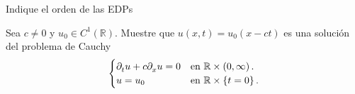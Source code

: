 \question

Indique el orden de las EDPs
\begin{multicols}{2}
\end{multicols}

\question

Sea $c\neq0$ y $u_{0}\in C^{1}\left(\mathbb{R}\right)$.
Muestre que $u\left(x,t\right)=u_{0}\left(x-ct\right)$ es una
solución del problema de Cauchy
\begin{equation*}
	\begin{cases}
		\difcp{u}{t}+
		c\difcp{u}{x}=
		0     &
		\text{en }\mathbb{R}\times\left(0,\infty\right). \\
		u=
		u_{0} &
		\text{en }\mathbb{R}\times\left\{t=0\right\}.
	\end{cases}
\end{equation*}

